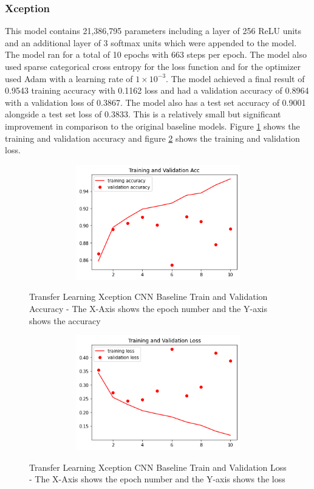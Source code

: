 \subsubsection{Xception}
This model contains 21,386,795 parameters including a layer of 256 ReLU units and an additional layer of 3 softmax units which were appended to the model. The model ran for a total of 10 epochs with 663 steps per epoch.  The model also used sparse categorical cross entropy for the loss function and for the optimizer used Adam with a learning rate of $1\times10^{-3}$. The model achieved a final result of 0.9543 training accuracy with  0.1162  loss and had a validation accuracy of 0.8964 with a validation loss of 0.3867.  The model also has a test set accuracy of 0.9001 alongside a test set loss of 0.3833.  This is a relatively small but significant improvement in comparison to the original baseline models.  Figure \ref{fig:Transfer Learning Xception CNN Baseline Train and Validation Accuracy Radiography} shows the training and validation accuracy and figure \ref{fig:Transfer Learning Xception CNN Baseline Train and Validation Loss Radiography} shows the training and validation loss. 
 \begin{figure}[H]
    \centering
    \includegraphics[width=1\textwidth,height=5cm,keepaspectratio]{Images/XceptionBaselineTrainingValidationAccRadiography.png}\\
    \caption{Transfer Learning Xception CNN Baseline Train and Validation Accuracy  - The X-Axis shows the epoch number and the Y-axis shows the accuracy}
    \label{fig:Transfer Learning Xception CNN Baseline Train and Validation Accuracy Radiography}
\end{figure}
 \begin{figure}[H]
    \centering    \includegraphics[width=1\textwidth,height=5cm,keepaspectratio]{Images/XceptionBaselineTrainingValidationLossRadiography.png}\\
    \caption{Transfer Learning Xception CNN Baseline Train and Validation Loss  - The X-Axis shows the epoch number and the Y-axis shows the loss}
    \label{fig:Transfer Learning Xception CNN Baseline Train and Validation Loss Radiography}
\end{figure}
